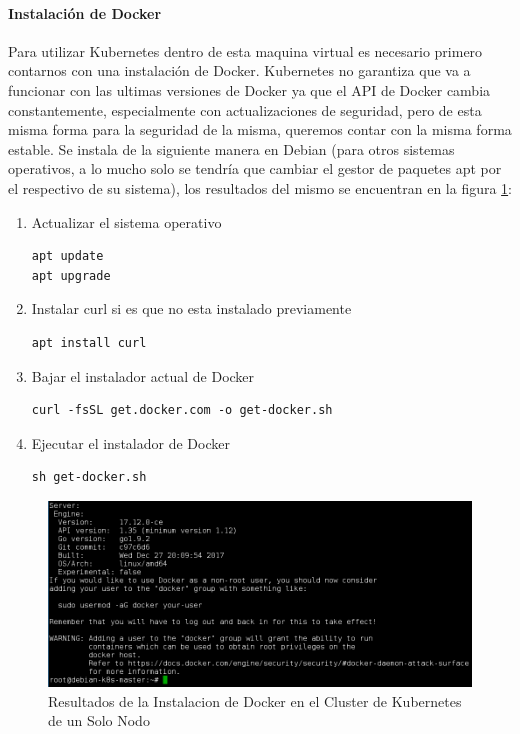 \paragraph{Instalación de Docker}
Para utilizar Kubernetes dentro de esta maquina virtual es necesario primero contarnos con una instalación de Docker. Kubernetes no garantiza que va a funcionar con las ultimas versiones de Docker ya que el API de Docker cambia constantemente, especialmente con actualizaciones de seguridad, pero de esta misma forma para la seguridad de la misma, queremos contar con la misma forma estable. Se instala de la siguiente manera en Debian (para otros sistemas operativos, a lo mucho solo se tendría que cambiar el gestor de paquetes apt por el respectivo de su sistema), los resultados del mismo se encuentran en la figura \ref{fig:resultados-instalacion-docker-k8s}:
\begin{enumerate}
	\item Actualizar el sistema operativo
    \begin{lstlisting}
apt update
apt upgrade
    \end{lstlisting}
    \item Instalar curl si es que no esta instalado previamente
    \begin{lstlisting}
apt install curl
    \end{lstlisting}
    \item Bajar el instalador actual de Docker
    \begin{lstlisting}
curl -fsSL get.docker.com -o get-docker.sh
    \end{lstlisting}
    \item Ejecutar el instalador de Docker
    \begin{lstlisting}
sh get-docker.sh
    \end{lstlisting}
\end{enumerate}
\begin{figure}
	\begin{center}
		\includegraphics[width=\textwidth]{Figures/k8s-docker-install.png}
	\end{center}
    \caption{Resultados de la Instalacion de Docker en el Cluster de Kubernetes de un Solo Nodo}
    \label{fig:resultados-instalacion-docker-k8s}
\end{figure}


